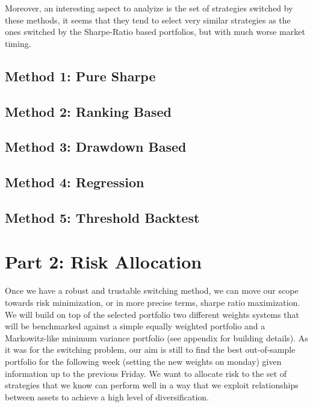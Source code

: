 \documentclass[12pt]{article} %
\numberwithin{equation}{subsection}
\begin{document}
Moreover, an interesting aspect to analyize is the set of strategies switched by these methods, it seems that they tend to select very similar strategies as the ones switched by the Sharpe-Ratio based portfolios, but with much worse market timing.\\

\subsection{Method 1: Pure Sharpe}




\subsection{Method 2: Ranking Based}




\subsection{Method 3: Drawdown Based}



\subsection{Method 4: Regression}



\subsection{Method 5: Threshold Backtest}



\section{Part 2: Risk Allocation}

Once we have a robust and trustable switching method, we can move our scope towards risk minimization, or in more precise terms, sharpe ratio maximization. We will build on top of the selected portfolio two different weights systems that will be benchmarked against a simple equally weighted portfolio and a Markowitz-like minimum variance portfolio (see appendix for building details). As it was for the switching problem, our aim is still to find the best out-of-sample portfolio for the following week (setting the new weights on monday) given information up to the previous Friday. We want to allocate risk to the set of strategies that we know can perform well in a way that we exploit relationships between assets to achieve a high level of diversification.\\
\end{document}
